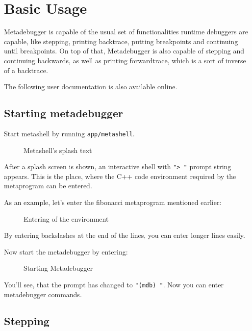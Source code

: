 \section{Basic Usage}

Metadebugger is capable of the usual set of functionalities runtime debuggers
are capable, like stepping, printing backtrace, putting breakpoints and
continuing until breakpoints. On top of that, Metadebugger is also capable of
stepping and continuing backwards, as well as printing forwardtrace, which is
a sort of inverse of a backtrace.

The following user documentation is also available online\cite{github}.

\subsection{Starting metadebugger}

Start metashell by running \texttt{app/metashell}.

\begin{figure}[H]
    
    \caption{Metashell's splash text}
\end{figure}

\noindent
After a splash screen is shown, an interactive shell with \texttt{"> "}
prompt string appears. This is the place, where the C++ code environment
required by the metaprogram can be entered.

As an example, let's enter the fibonacci metaprogram mentioned earlier:

\begin{figure}[H]
    
    \caption{Entering of the environment}
\end{figure}

\noindent
By entering backslashes at the end of the lines, you can enter longer lines
easily.

Now start the metadebugger by entering:

\begin{figure}[H]
    
    \caption{Starting Metadebugger}
\end{figure}

\noindent
You'll see, that the prompt has changed to \texttt{"(mdb) "}. Now you can enter
metadebugger commands.

\subsection{Stepping}

